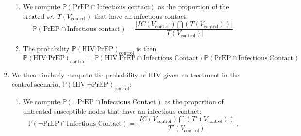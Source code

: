 \documentclass{article}
\theoremstyle{definition}
\begin{document}
\begin{enumerate}
\begin{enumerate}
    \item We compute $\mathbb{P}\left( \text{PrEP} \cap \text{Infectious contact}\right)$ as the proportion of the treated set  $T(V_{\text{control}})$ that have an infectious contact: \begin{equation}
        \mathbb{P}\left( \text{PrEP} \cap \text{Infectious contact}\right)=\frac{\vert IC\left(V_{\text{control}}\right) \bigcap \left({T\left(V_{\text{control}}\right)}\right)\vert}{\vert T\left(V_{\text{control}}\right)\vert}.\nonumber
    \end{equation}
    \item The probability $\mathbb{P}\left(\text{HIV} \vert \text{PrEP}\right)_{\text{control}}$ is then 
    \begin{equation}
        \mathbb{P}\left(\text{HIV} \vert \text{PrEP}\right)_{\text{control}}=\mathbb{P}\left(\text{HIV} \vert \text{PrEP} \cap \text{Infectious Contact}\right) \mathbb{P}\left(\text{PrEP} \cap \text{Infectious Contact}\right)\nonumber
    \end{equation}
    \end{enumerate}
    \item We then similarly compute the probability of HIV given no treatment in the control scenario, $\mathbb{P} \left(\text{HIV} \vert \neg \text{PrEP}\right)_{\text{control}}$:
    \begin{enumerate}
    \item We compute $\mathbb{P}\left(\neg \text{PrEP} \cap \text{Infectious Contact} \right)  $ as the proportion of untreated susceptible nodes that have an infectious contact:
    \begin{equation}
        \mathbb{P}\left(\neg \text{PrEP} \cap \text{Infectious Contact} \right)=\frac{\vert IC\left(V_{\text{control}}\right) \bigcap \left({T'\left(V_{\text{control}}\right)}\right)\vert}{\vert T'\left(V_{\text{control}}\right)\vert},\nonumber
    \end{equation}


\end{enumerate}
\end{enumerate}
\end{document}
